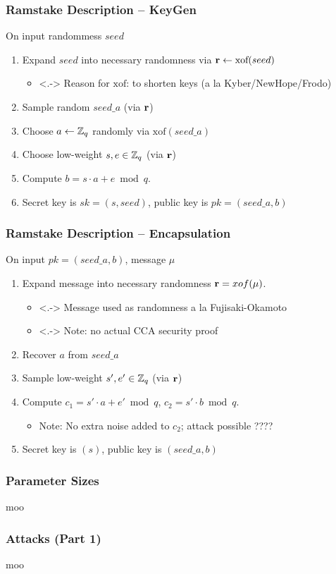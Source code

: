\documentclass[11pt,t,xcolor=pdftex,svgnames]{beamer}
\newcommand{\xof}{\ensuremath{\text{xof}}}
\begin{document}
\begin{frame}\frametitle{Ramstake Description -- KeyGen}
\onslide<+->
On input randommess $seed$
\begin{enumerate}
\item<+-> Expand $seed$ into necessary randomness via $\vecr \gets
  \xof(seed)$
\begin{itemize}
\smallskip
\item<.-> Reason for $\text{xof}$: to
  shorten keys (a la Kyber/NewHope/Frodo)
\smallskip
\end{itemize}
\item<+-> Sample random $seed\_a$ (via $\mathbf{r}$)
\medskip
\item<+-> Choose $a \gets \mathbb{Z}_q$ randomly via $\text{xof}(seed\_a)$ 
\medskip
\item<+-> Choose \alert{low-weight} $s, e \in \mathbb{Z}_q$ (via $\mathbf{r}$)
\medskip
\item<+-> Compute $b = s\cdot a + e \bmod{q}$. 
\medskip
\item<+-> Secret key is $sk=(s, seed)$, public key is $pk=(seed\_a, b)$
\end{enumerate}
\end{frame}

\begin{frame}\frametitle{Ramstake Description -- Encapsulation}
\onslide<+->
On input $pk=(seed\_a,b)$, message $\mu$
\begin{enumerate}
\item<+-> Expand message into necessary randomness $\mathbf{r}=xof(\mu)$.
\begin{itemize}
\smallskip
\item<.-> Message used as randomness a la Fujisaki-Okamoto 
\medskip
\item<.-> Note: no actual CCA security proof 
\end{itemize}
\item<+-> Recover $a$ from $seed\_a$
\medskip
\item<+-> Sample \alert{low-weight} $s', e' \in \mathbb{Z}_q$ (via $\mathbf{r}$)
\medskip
\item<+-> Compute $c_1 = s'\cdot a + e' \bmod{q}$, $c_2 = s'\cdot b
  \bmod{q}$.
\begin{itemize}
\item<+-> \alert{Note}: No extra noise added to $c_2$; attack possible
  ????
\end{itemize} 
\medskip
\item<+-> Secret key is $(s)$, public key is $(seed\_a, b)$
\end{enumerate}
\end{frame}

\begin{frame}\frametitle{Parameter Sizes}
moo
\end{frame}

\begin{frame}\frametitle{Attacks (Part 1)}
moo
\end{frame}
\end{document}
